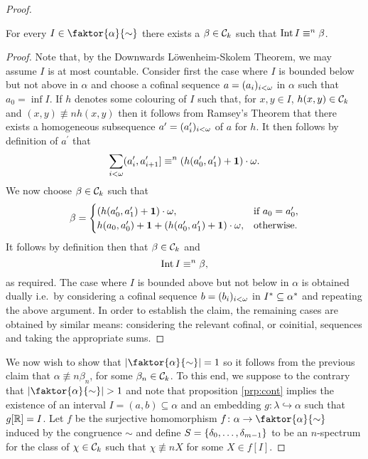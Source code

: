 \begin{proof}
	\begin{claim}\label{clm:contInt}
		For every $I\in\faktor{\alpha}{\sim}$ there exists a $\beta\in\mathcal{C}_k$ such that $\operatorname{Int} I\equiv^{n}\beta$.
	\end{claim}
	\begin{proof}
		Note that, by the Downwards L\"owenheim-Skolem Theorem, we may assume $I$ is at most countable.  Consider first the case where $I$ is bounded below but not above in $\alpha$ and choose a cofinal sequence $a=(a_i)_{i<\omega}$ in $\alpha$ such that $a_0=\inf I$.  If $h$ denotes some colouring of $I$ such that, for $x,y\in I$, $h(x,y)\in\mathcal{C}_k$ and $(x,y)\nequiv{n}h(x,y)$ then it follows from Ramsey's Theorem that there exists a homogeneous subsequence $a^\prime=(a^\prime_i)_{i<\omega}$ of $a$ for $h$.  It then follows by definition of $a^\prime$ that
		\begin{equation}
			\sum_{i<\omega}(a^\prime_i,a^\prime_{i+1}]\equiv^{n}\left(h(a^\prime_0,a^\prime_1)+\mathbf{1}\right)\cdot\omega.
		\end{equation}
		We now choose $\beta\in\mathcal{C}_k$ such that
		\begin{equation}
			\beta=\begin{cases}
				\left(h(a^\prime_0,a^\prime_1)+\mathbf{1}\right)\cdot\omega,                        & \text{if }a_0=a^\prime_0, \\
				h(a_0,a^\prime_0)+\mathbf{1}+\left(h(a^\prime_0,a^\prime_1)+\mathbf{1}\right)\cdot\omega, & \text{otherwise}.         \\
			\end{cases}
		\end{equation}
		It follows by definition then that $\beta\in\mathcal{C}_k$ and
		\begin{equation}
			\operatorname{Int} I\equiv^{n}\beta,
		\end{equation}
		as required.  The case where $I$ is bounded above but not below in $\alpha$ is obtained dually i.e.\ by considering a cofinal sequence $b=(b_i)_{i<\omega}$ in ${I}^\ast\subseteq{\alpha}^\ast$ and repeating the above argument.  In order to establish the claim, the remaining cases are obtained by similar means: considering the relevant cofinal, or coinitial, sequences and taking the appropriate sums.
	\end{proof}

	We now wish to show that $\card{\faktor{\alpha}{\sim}}=1$ so it follows from the previous claim that $\alpha\nequiv{n}\beta_n$, for some $\beta_n\in\mathcal{C}_k$.  To this end, we suppose to the contrary that $\card{\faktor{\alpha}{\sim}}>1$ and note that proposition \ref{prp:cont} implies the existence of an interval $I=(a,b)\subseteq\alpha$ and an embedding $g\colon\lambda\hookrightarrow\alpha$ such that $g[\mathbb{R}]=I$.  Let $f$ be the surjective homomorphism $f\colon\alpha\to\faktor{\alpha}{\sim}$ induced by the congruence $\sim$ and define $S=\left\lbrace \delta_0,\dotsc,\delta_{m-1}\right\rbrace$ to be an $n$-spectrum for the class of $\chi\in\mathcal{C}_k$ such that $\chi\nequiv{n}X$ for some $X\in f[I]$.


\end{proof}
